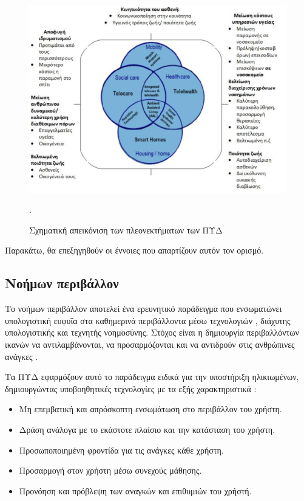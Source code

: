 \begin{figure}[h!]
\centering
\includegraphics[scale=0.9]{images/aal.png}
\caption{Σχηματική απεικόνιση των πλεονεκτήματων των ΠΥΔ}.
\label{aalpro}
\end{figure}

Παρακάτω, θα επεξηγηθούν οι έννοιες που απαρτίζουν αυτόν τον ορισμό.

\subsection{Νοήμων περιβάλλον}
Το νοήμων περιβάλλον αποτελεί ένα ερευνητικό παράδειγμα που ενσωματώνει υπολογιστική ευφυΐα στα καθημερινά περιβάλλοντα μέσω τεχνολογιών , διάχυτης υπολογιστικής και τεχνητής νοημοσύνης. Στόχος είναι η δημιουργία περιβαλλόντων ικανών να αντιλαμβάνονται, να προσαρμόζονται και να αντιδρούν στις ανθρώπινες ανάγκες \cite{Aarts2003}.

Τα ΠΥΔ εφαρμόζουν αυτό το παράδειγμα ειδικά για την υποστήριξη ηλικιωμένων, δημιουργώντας υποβοηθητικές τεχνολογίες με τα εξής χαρακτηριστικά \cite{Acampora2013}\cite{Blackman2016}:
\begin{itemize}
    \item Μη επεμβατική και απρόσκοπτη ενσωμάτωση στο περιβάλλον του χρήστη.
    \item Δράση ανάλογα με το εκάστοτε πλαίσιο και την κατάσταση του χρήστη. 
    \item Προσωποποιημένη φροντίδα για τις ανάγκες κάθε χρήστη. 
    \item Προσαρμογή στον χρήστη μέσω συνεχούς μάθησης.
    \item Προνόηση και πρόβλεψη των αναγκών και επιθυμιών του χρήστή.
\end{itemize}

